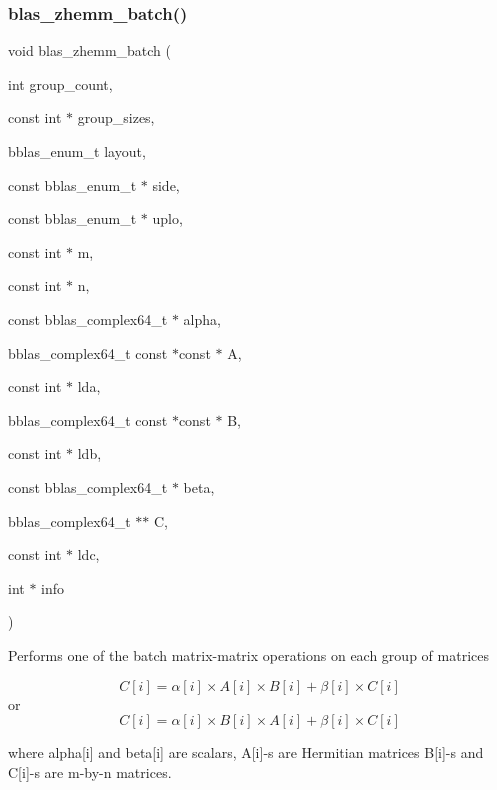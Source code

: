 \subsubsection{\texorpdfstring{blas\+\_\+zhemm\+\_\+batch()}{blas\_zhemm\_batch()}}
{\footnotesize\ttfamily void blas\+\_\+zhemm\+\_\+batch (\begin{DoxyParamCaption}\item[{int}]{group\+\_\+count,  }\item[{const int $\ast$}]{group\+\_\+sizes,  }\item[{bblas\+\_\+enum\+\_\+t}]{layout,  }\item[{const bblas\+\_\+enum\+\_\+t $\ast$}]{side,  }\item[{const bblas\+\_\+enum\+\_\+t $\ast$}]{uplo,  }\item[{const int $\ast$}]{m,  }\item[{const int $\ast$}]{n,  }\item[{const bblas\+\_\+complex64\+\_\+t $\ast$}]{alpha,  }\item[{bblas\+\_\+complex64\+\_\+t const $\ast$const $\ast$}]{A,  }\item[{const int $\ast$}]{lda,  }\item[{bblas\+\_\+complex64\+\_\+t const $\ast$const $\ast$}]{B,  }\item[{const int $\ast$}]{ldb,  }\item[{const bblas\+\_\+complex64\+\_\+t $\ast$}]{beta,  }\item[{bblas\+\_\+complex64\+\_\+t $\ast$$\ast$}]{C,  }\item[{const int $\ast$}]{ldc,  }\item[{int $\ast$}]{info }\end{DoxyParamCaption})}

Performs one of the batch matrix-\/matrix operations on each group of matrices

\[ C[i] = \alpha[i] \times A[i] \times B[i] + \beta[i] \times C[i] \] or \[ C[i] = \alpha[i] \times B[i] \times A[i] + \beta[i] \times C[i] \]

where alpha\mbox{[}i\mbox{]} and beta\mbox{[}i\mbox{]} are scalars, A\mbox{[}i\mbox{]}-\/s are Hermitian matrices B\mbox{[}i\mbox{]}-\/s and C\mbox{[}i\mbox{]}-\/s are m-\/by-\/n matrices.


